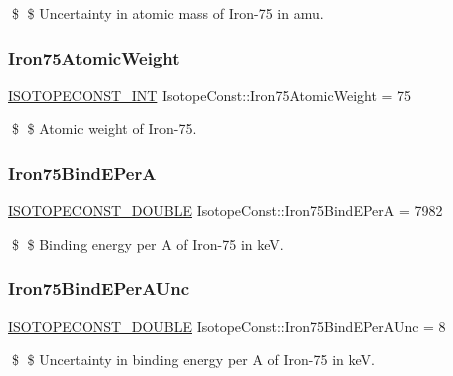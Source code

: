 \$ \$ Uncertainty in atomic mass of Iron-\/75 in amu. \mbox{\label{group___isotope_const-_iron-_fe75_ga5b6b6b1b441760a22463ba5d48af532c}} 
\subsubsection{\texorpdfstring{Iron75\+Atomic\+Weight}{Iron75AtomicWeight}}
{\footnotesize\ttfamily \mbox{\hyperlink{group___isotope_const-_macros_ga5f18360b3e99483a35c32d789e62621c}{I\+S\+O\+T\+O\+P\+E\+C\+O\+N\+S\+T\+\_\+\+I\+NT}} Isotope\+Const\+::\+Iron75\+Atomic\+Weight = 75}

\$ \$ Atomic weight of Iron-\/75. \mbox{\label{group___isotope_const-_iron-_fe75_ga2a657876778602137f6ab5c04b4c4944}} 
\subsubsection{\texorpdfstring{Iron75\+Bind\+E\+PerA}{Iron75BindEPerA}}
{\footnotesize\ttfamily \mbox{\hyperlink{group___isotope_const-_macros_ga8f45a7272ce02c0b4c65c44636ed719a}{I\+S\+O\+T\+O\+P\+E\+C\+O\+N\+S\+T\+\_\+\+D\+O\+U\+B\+LE}} Isotope\+Const\+::\+Iron75\+Bind\+E\+PerA = 7982}

\$ \$ Binding energy per A of Iron-\/75 in keV. \mbox{\label{group___isotope_const-_iron-_fe75_ga71ffe97b40329ffcdfa467e31dcbc68c}} 
\subsubsection{\texorpdfstring{Iron75\+Bind\+E\+Per\+A\+Unc}{Iron75BindEPerAUnc}}
{\footnotesize\ttfamily \mbox{\hyperlink{group___isotope_const-_macros_ga8f45a7272ce02c0b4c65c44636ed719a}{I\+S\+O\+T\+O\+P\+E\+C\+O\+N\+S\+T\+\_\+\+D\+O\+U\+B\+LE}} Isotope\+Const\+::\+Iron75\+Bind\+E\+Per\+A\+Unc = 8}

\$ \$ Uncertainty in binding energy per A of Iron-\/75 in keV. \mbox{\label{group___isotope_const-_iron-_fe75_gaa736abaaf406b9829b82dc0bcbf11c0c}} 
